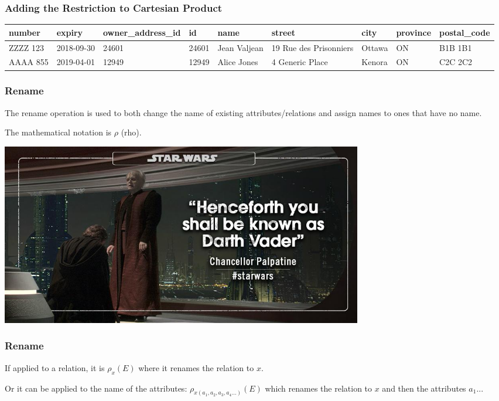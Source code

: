 \begin{frame}
\frametitle{Adding the Restriction to Cartesian Product}


{\tiny
\begin{center}
	\begin{tabular}{|l|l|l|l|l|l|l|l|l|}\hline
		\textbf{number} & \textbf{expiry} & \textbf{owner\_address\_id} & \textbf{id} & \textbf{name} &\textbf{street} & \textbf{city} & \textbf{province} & \textbf{postal\_code} \\ \hline
		ZZZZ 123 & 2018-09-30 & 24601 & 24601 & Jean Valjean & 19 Rue des Prisonniers & Ottawa & ON & B1B 1B1\\ \hline
		AAAA 855 & 2019-04-01 & 12949 & 12949 & Alice Jones & 4 Generic Place & Kenora & ON & C2C 2C2\\ \hline
	\end{tabular}
\end{center}
}


\end{frame}



\begin{frame}
\frametitle{Rename}

The \alert{rename} operation is used to both change the name of existing attributes/relations and assign names to ones that have no name. 

The mathematical notation is $\rho$ (rho).

\begin{center}
	\includegraphics[width=0.7\textwidth]{images/asvader.jpg}
\end{center}

\end{frame}



\begin{frame}
\frametitle{Rename}

 If applied to a relation, it is $\rho_{x}(E)$ where it renames the relation to $x$. 
 
Or it can be applied to the name of the attributes: $\rho_{x(a_{1}, a_{2}, a_{3}, a_{4}...)}(E)$ which renames the relation to $x$ and then the attributes $a_{1}$...

\end{frame}



